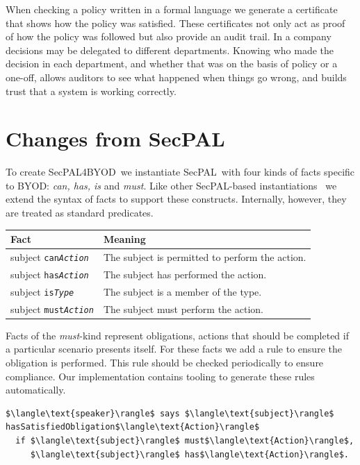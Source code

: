 \documentclass{llncs}
\newcommand{\AppPAL}[0]{SecPAL4BYOD}
\newcommand{\todo}[1]{\marginpar{\begin{mdframed}[userdefinedwidth=1cm]\tiny\sffamily\raggedright #1\end{mdframed}}}
\begin{document}
When checking a policy written in a formal language we generate a certificate that shows how the policy was satisfied.
These certificates not only act as proof of how the policy was followed but also provide an audit trail.
In a company decisions may be delegated to different departments.
Knowing who made the decision in each department, and whether that was on the basis of policy or a one-off, allows auditors to see what happened when things go wrong, and builds trust that a system is working correctly.

\todo{How is this better than logging?}


\section{Changes from SecPAL}
\label{ssec:changes}

To create \AppPAL~we instantiate SecPAL~with four kinds of facts specific to BYOD: \emph{can, has, is} and \emph{must}.
Like other SecPAL-based instantiations~\cite{becker_framework_2009,aziz_secpal4dsa:_2011} we extend the syntax of facts to support these constructs.
Internally, however, they are treated as standard predicates.

\begin{center}
  \footnotesize\sffamily
  \newcommand{\predicate}[3]{#1 \texttt{#2\textit{#3}}}
  \begin{tabular}{l l}
    \toprule
    Fact                              & Meaning                                         \\
    \midrule
    \predicate{subject}{can}{Action}  & The subject is permitted to perform the action. \\
    \predicate{subject}{has}{Action}  & The subject has performed the action.           \\
    \predicate{subject}{is}{Type}     & The subject is a member of the type.            \\
    \predicate{subject}{must}{Action} & The subject must perform the action.            \\
    \bottomrule
  \end{tabular}
\end{center}

Facts of the \emph{must}-kind represent obligations, actions that should be completed if a particular scenario presents itself.
For these facts we add a rule to ensure the obligation is performed.
This rule should be checked periodically to ensure compliance.
Our implementation contains tooling to generate these rules automatically.
\begin{lstlisting}
$\langle\text{speaker}\rangle$ says $\langle\text{subject}\rangle$ hasSatisfiedObligation$\langle\text{Action}\rangle$
  if $\langle\text{subject}\rangle$ must$\langle\text{Action}\rangle$,
     $\langle\text{subject}\rangle$ has$\langle\text{Action}\rangle$.
\end{lstlisting}
\end{document}

